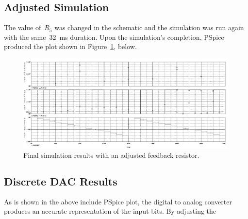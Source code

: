 \subsection{Adjusted Simulation}
The value of~$R_5$ was changed in the schematic and the simulation was run
again with the same~\SI{32}{\milli\second} duration.  Upon the simulation's
completion, PSpice produced the plot shown in Figure~\ref{f:dac_plot2}, below.
%
\begin{figure}[H]
\centering
	\includegraphics[width=.8\textwidth]{img/plot/part1_plot2b.PNG}
	\parbox{.8\textwidth}{
	\caption[Discrete DAC --- Tuned Results]{Final simulation results with an adjusted feedback resistor.}
	\label{f:dac_plot2}}
\end{figure}

\subsection{Discrete DAC Results}
As is shown in the above include PSpice plot, the digital to analog converter produces an accurate representation of the input bits.  By adjusting the
